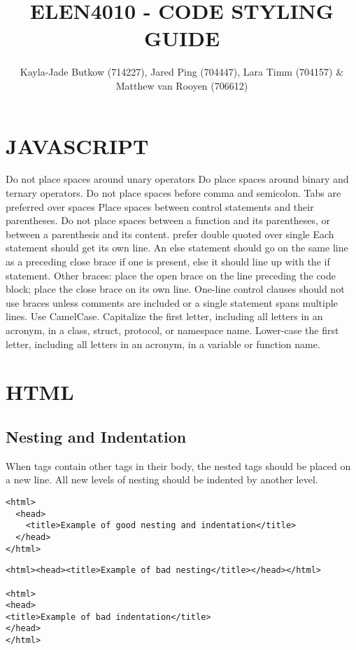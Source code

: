 \documentclass[10pt,onecolumn]{witseiepaper}
\title{ELEN4010 - CODE STYLING GUIDE}
\author{Kayla-Jade Butkow (714227), Jared Ping (704447), Lara Timm (704157) \& Matthew van Rooyen (706612)}
\begin{document}
\maketitle
\pagestyle{plain}
\setcounter{page}{1}

\section{JAVASCRIPT}


Do not place spaces around unary operators
Do place spaces around binary and ternary operators.
Do not place spaces before comma and semicolon.
Tabs are preferred over spaces
Place spaces between control statements and their parentheses.
Do not place spaces between a function and its parentheses, or between a parenthesis and its content.
prefer double quoted over single
Each statement should get its own line.
An else statement should go on the same line as a preceding close brace if one is present, else it should line up with the if statement.
Other braces: place the open brace on the line preceding the code block; place the close brace on its own line.
One-line control clauses should not use braces unless comments are included or a single statement spans multiple lines.
Use CamelCase. Capitalize the first letter, including all letters in an acronym, in a class, struct, protocol, or namespace name. Lower-case the first letter, including all letters in an acronym, in a variable or function name.

\section{HTML}
\lstset{language=HTML, basicstyle=\ttfamily}

\subsection{\textbf{Nesting and Indentation}}

When tags contain other tags in their body, the nested tags should be placed on a new line. All new levels of nesting should be indented by another level.

\begin{lstlisting}[backgroundcolor=\color{green!20}]
<html>
  <head>
    <title>Example of good nesting and indentation</title>
  </head>
</html>
\end{lstlisting}

\begin{lstlisting}[backgroundcolor=\color{red!20}]
<html><head><title>Example of bad nesting</title></head></html>

<html>
<head>
<title>Example of bad indentation</title>
</head>
</html>
\end{lstlisting}
\end{document}
